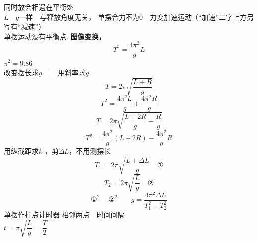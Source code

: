 同时放会相遇在平衡处\\
$L$　$g$一样　与释放角度无关，
单摆合力不为$0$　力变加速运动（“加速”二字上方另写有“减速”）\\
单摆运动没有平衡点.
\textbf{图像变换，}
\[
T^2=\dfrac{4\pi^2}{g}L
\]
$\pi^2=9.86$\\
改变摆长求$g$　$\big|$　用斜率求$g$
\[
T=2\pi\sqrt{\dfrac{L+R}{g}}
\]
\[
T^2=\dfrac{4\pi^2L}{g}+\dfrac{4\pi^2R}{g}
\]
\[
T=2\pi\sqrt{\dfrac{L+2R}{g}-\dfrac{R}{g}}
\]
\[
T^2=\dfrac{4\pi^2}{g}(L+2R)-\dfrac{4\pi^2}{g}R
\]
用纵截距求$k$ %
，剪$\Delta L$，不用测摆长
\[
T_1=2\pi\sqrt{\dfrac{L+\Delta L}{g}}\quad\text{①}
\]
\[
T_2=2\pi\sqrt{\dfrac{L}{g}}\quad\text{②}
\]
\[
\text{①}^2-\text{②}^2\qquad g=\dfrac{4\pi^2\Delta L}{T_1^2-T_2^2}
\]
单摆作打点计时器
相邻两点　时间间隔\\
$t=\pi\sqrt{\dfrac{L}{g}}=\dfrac{T}{2}$
